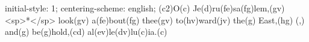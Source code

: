 initial-style: 1;
centering-scheme: english;
(c2)O(c) Je(d)ru(fe)sa(fg)lem,(gv) <sp>*</sp> look(gv) a(fe)bout(fg) thee(gv) to(hv)ward(jv) the(g) East,(hg) (,) and(g) be(g)hold,(cd) al(ev)le(dv)lu(c)ia.(c)
